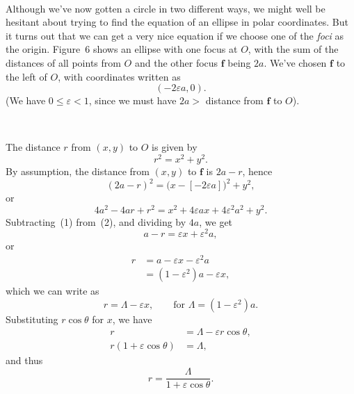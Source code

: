 \begin{center}
\\[0.6em]
\end{center}

Although we've now gotten a circle in two different ways, we might well be
hesitant about trying to find the equation of an ellipse in polar coordinates.
But it turns out that we can get a very nice equation if we choose one of the
\emph{foci} as the origin. Figure~6 shows an ellipse with one focus at $O$,
with the sum of the distances of all points from $O$ and the other focus
$\mathbf{f}$ being $2a$. We've chosen $\mathbf{f}$ to the left of $O$, with
coordinates written as
\[
(-2\varepsilon a,0).
\]
(We have $0\leq\varepsilon<1$, since we must have $2a>$ distance from
$\mathbf{f}$ to $O$).

\begin{center}
\\[0.6em]
\end{center}

The distance $r$ from $(x,y)$ to $O$ is given by
\begin{equation}
r^2=x^2+y^2.\tag{1}
\end{equation}
By assumption, the distance from $(x,y)$ to $\mathbf{f}$ is $2a-r$, hence
\[
(2a-r)^2=\bigl(x-[-2\varepsilon a]\bigr)^2+y^2,
\]
or
\begin{equation}
4a^2-4ar+r^2=x^2+4\varepsilon ax+4\varepsilon^2a^2+y^2.\tag{2}
\end{equation}
Subtracting~(1) from~(2), and dividing by $4a$, we get
\[
a-r=\varepsilon x+\varepsilon^2 a,
\]
or
\begin{align*}
r&=a-\varepsilon x-\varepsilon^2 a\\
&=(1-\varepsilon^2)a-\varepsilon x,
\end{align*}
which we can write as
\begin{equation}
r=\Lambda-\varepsilon x, \qquad\text{for }\Lambda=(1-\varepsilon^2)a.\tag{3}
\end{equation}
Substituting $r\cos\theta$ for $x$, we have
\begin{align*}
r&=\Lambda-\varepsilon r\cos\theta,\\
r(1+\varepsilon\cos\theta)&=\Lambda,
\end{align*}
and thus
\begin{equation}
r=\frac{\Lambda}{1+\varepsilon\cos\theta}.\tag{4}
\end{equation}

